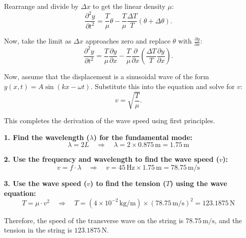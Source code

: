 \documentclass[journal,12pt,twocolumn]{IEEEtran}
\theoremstyle{remark}
\begin{document}
Rearrange and divide by $\Delta x$ to get the linear density $\mu$:
\begin{equation}\label{eq:linear_density}
    \frac{\partial^2y}{\partial t^2} = \frac{T}{\mu} \theta - \frac{T}{\mu} \frac{\Delta T}{T}(\theta + \Delta \theta).
\end{equation}

Now, take the limit as $\Delta x$ approaches zero and replace $\theta$ with $\frac{\partial y}{\partial x}$:
\begin{equation}\label{eq:limit}
    \frac{\partial^2y}{\partial t^2} = \frac{T}{\mu} \frac{\partial y}{\partial x} - \frac{T}{\mu} \frac{\partial}{\partial x} \left(\frac{\Delta T}{T}\frac{\partial y}{\partial x}\right).
\end{equation}

Now, assume that the displacement is a sinusoidal wave of the form $y(x, t) = A \sin(kx - \omega t)$. Substitute this into the equation and solve for $v$:
\begin{equation}\label{eq:wave_speed}
    v = \sqrt{\frac{T}{\mu}}.
\end{equation}

This completes the derivation of the wave speed using first principles.

\textbf{1. Find the wavelength (\(\lambda\)) for the fundamental mode:}
\begin{equation}\label{eq:wavelength}
    \lambda = 2L \quad \Rightarrow \quad \lambda = 2 \times 0.875 \, \text{m} = 1.75 \, \text{m}
\end{equation}

\textbf{2. Use the frequency and wavelength to find the wave speed (\(v\)):}
\begin{equation}\label{eq:wavespeed}
    v = f \cdot \lambda \quad \Rightarrow \quad v = 45 \, \text{Hz} \times 1.75 \, \text{m} = 78.75 \, \text{m/s}
\end{equation}


\textbf{3. Use the wave speed (\(v\)) to find the tension (\(T\)) using the wave equation:}
\begin{equation}\label{eq:tension}
    T = \mu \cdot v^2 \quad \Rightarrow \quad T = (4 \times 10^{-2} \, \text{kg/m}) \times (78.75 \, \text{m/s})^2 = 123.1875 \, \text{N}
\end{equation}

Therefore, the speed of the transverse wave on the string is $78.75 \, \text{m/s}$, and the tension in the string is $123.1875 \, \text{N}$.
\end{document}
